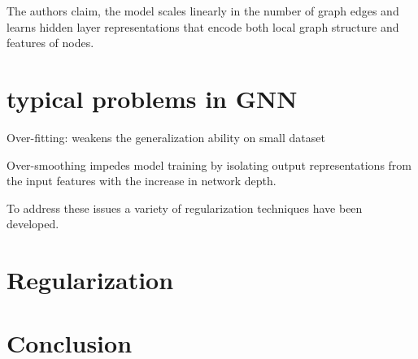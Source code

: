 The authors claim, the model scales linearly in the number of graph edges and learns hidden layer
representations that encode both local graph structure and features of nodes.
\section{typical problems in GNN}

Over-fitting: weakens the generalization ability on small dataset

Over-smoothing impedes model training by isolating output representations from the input features with the increase in network depth.

To address these issues a variety of regularization techniques have been developed.

\section{Regularization}
\section{Conclusion}
\label{sec:related:conclusion}

